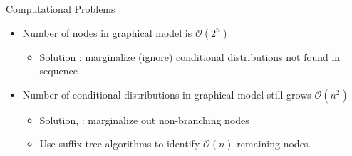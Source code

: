 \begin{frame}[t]{Computational Problems}
\begin{itemize}
\item Number of nodes in graphical model is $\mathcal{O}(2^n)$
\begin{itemize}
\item Solution : marginalize (ignore) conditional distributions not found in sequence
\end{itemize}
\item Number of conditional distributions in graphical model still grows $\mathcal{O}(n^2)$
\begin{itemize}
\item Solution, \citet{Wood2009} : marginalize out non-branching nodes \cite{Pitman1999, Ho2006}
\item Use suffix tree algorithms to identify  $\mathcal{O}(n)$ remaining nodes.
\end{itemize}
\end{itemize}
\end{frame}




